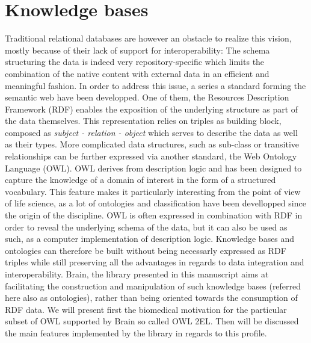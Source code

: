 \documentclass{bioinfo}
\begin{document}
\section{Knowledge bases}
Traditional relational databases are however an obstacle to realize this vision, mostly because of their lack of support for interoperability:
The schema structuring the data is indeed very repository-specific which limits the combination of the native content with external data in an
efficient and meaningful fashion. In order to address this issue, a series a standard forming the semantic web have been developped. One of them,
the Resources Description Framework (RDF) enables the exposition of the underlying structure as part of the data themselves. This
representation relies on triples as building block, composed as \emph{subject - relation - object} which serves to
describe the data as well as their types. More complicated data structures, such as sub-class or
transitive relationships can be further expressed via another standard, the Web Ontology Language (OWL). OWL derives from description logic and
has been designed to capture the knowledge of a domain of interest in the form of a structured vocabulary. This feature makes it particularly 
interesting from the point of view of life science, as a lot of ontologies and classification have been devellopped since the origin of 
the discipline. OWL is often expressed in combination with RDF in order to reveal the underlying schema of the data, but 
it can also be used as such, as a computer implementation of description logic. 
Knowledge bases and ontologies can therefore be built without being necessarly expressed as RDF triples while still preserving all the 
advantages in regards to data integration and interoperability.
Brain, the library presented in this manuscript aims at facilitating the construction and manipulation of 
such knowledge bases (referred here also as ontologies), rather than being oriented towards the consumption of RDF data. 
We will present first the biomedical motivation for the particular subset of OWL supported by Brain so called OWL 2EL. 
Then will be discussed the main features implemented by the library in regards to this profile.
\end{document}

